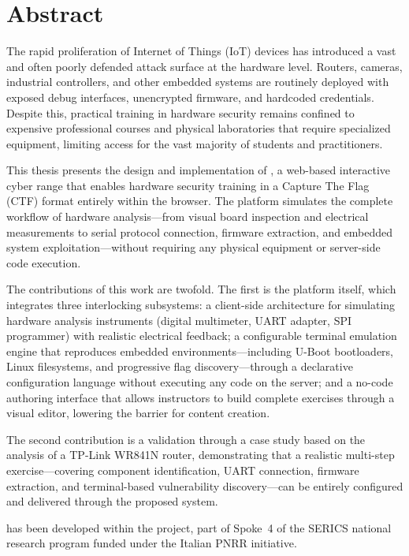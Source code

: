 \chapter*{Abstract}\label{chap:Abstract}

The rapid proliferation of Internet of Things (IoT) devices has introduced a vast and often poorly defended attack surface at the hardware level. Routers, cameras, industrial controllers, and other embedded systems are routinely deployed with exposed debug interfaces, unencrypted firmware, and hardcoded credentials. Despite this, practical training in hardware security remains confined to expensive professional courses and physical laboratories that require specialized equipment, limiting access for the vast majority of students and practitioners.

This thesis presents the design and implementation of \pcbctf{}, a web-based interactive cyber range that enables hardware security training in a Capture The Flag (CTF) format entirely within the browser. The platform simulates the complete workflow of hardware analysis---from visual board inspection and electrical measurements to serial protocol connection, firmware extraction, and embedded system exploitation---without requiring any physical equipment or server-side code execution.

The contributions of this work are twofold. The first is the \pcbctf{} platform itself, which integrates three interlocking subsystems: a client-side architecture for simulating hardware analysis instruments (digital multimeter, UART adapter, SPI programmer) with realistic electrical feedback; a configurable terminal emulation engine that reproduces embedded environments---including U-Boot bootloaders, Linux filesystems, and progressive flag discovery---through a declarative configuration language without executing any code on the server; and a no-code authoring interface that allows instructors to build complete exercises through a visual editor, lowering the barrier for content creation.

The second contribution is a validation through a case study based on the analysis of a TP-Link WR841N router, demonstrating that a realistic multi-step exercise---covering component identification, UART connection, firmware extraction, and terminal-based vulnerability discovery---can be entirely configured and delivered through the proposed system.

\pcbctf{} has been developed within the \artic{} project, part of Spoke~4 of the SERICS national research program funded under the Italian PNRR initiative.
